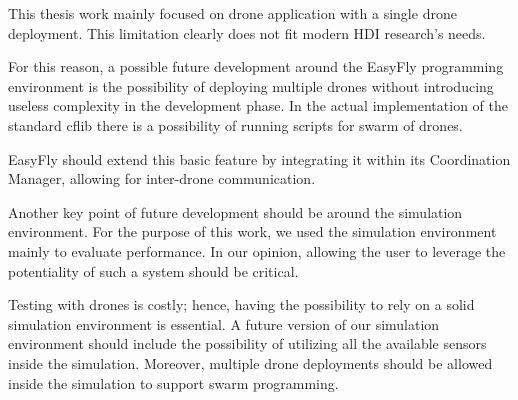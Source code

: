 
This thesis work mainly focused on drone application with a single drone deployment. 
This limitation clearly does not fit modern HDI research's needs. 

For this reason, a possible future development around the EasyFly programming environment is the possibility of deploying multiple drones without introducing useless complexity in the development phase.
In the actual implementation of the standard cflib there is a possibility of running scripts for swarm of drones.

EasyFly should extend this basic feature by integrating it within its Coordination Manager, allowing for inter-drone communication.

Another key point of future development should be around the simulation environment. 
For the purpose of this work, we used the simulation environment mainly to evaluate performance.
In our opinion, allowing the user to leverage the potentiality of such a system should be critical.

Testing with drones is costly; hence, having the possibility to rely on a solid simulation environment is essential.
A future version of our simulation environment should include the possibility of utilizing all the available sensors inside the simulation. 
Moreover, multiple drone deployments should be allowed inside the simulation to support swarm programming.